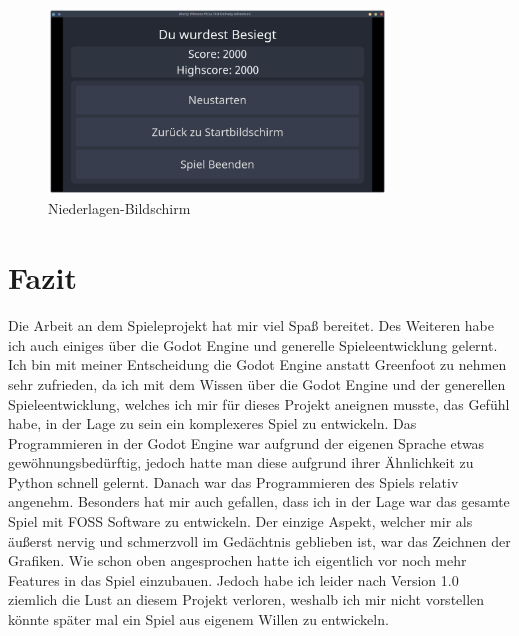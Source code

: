 \documentclass{article}
\begin{document}
			\begin{figure}[H]
				\begin{center}
					\includegraphics[width=0.8\textwidth]{lose.png}
				\end{center}
				\caption{Niederlagen-Bildschirm}
			\end{figure}

	\section{Fazit}
	
	Die Arbeit an dem Spieleprojekt hat mir viel Spaß bereitet. Des Weiteren habe ich auch einiges über die Godot Engine und generelle Spieleentwicklung gelernt. Ich bin mit meiner Entscheidung die Godot Engine anstatt Greenfoot zu nehmen sehr zufrieden, da ich mit dem Wissen über die Godot Engine und der generellen Spieleentwicklung, welches ich mir für dieses Projekt aneignen musste, das Gefühl habe, in der Lage zu sein ein komplexeres Spiel zu entwickeln. Das Programmieren in der Godot Engine war aufgrund der eigenen Sprache etwas gewöhnungsbedürftig, jedoch hatte man diese aufgrund ihrer Ähnlichkeit zu Python schnell gelernt. Danach war das Programmieren des Spiels relativ angenehm. Besonders hat mir auch gefallen, dass ich in der Lage war das gesamte Spiel mit FOSS Software zu entwickeln. Der einzige Aspekt, welcher mir als äußerst nervig und schmerzvoll im Gedächtnis geblieben ist, war das Zeichnen der Grafiken. Wie schon oben angesprochen hatte ich eigentlich vor noch mehr Features in das Spiel einzubauen. Jedoch habe ich leider nach Version 1.0 ziemlich die Lust an diesem Projekt verloren, weshalb ich mir nicht vorstellen könnte später mal ein Spiel aus eigenem Willen zu entwickeln.
	
	
\end{document}
